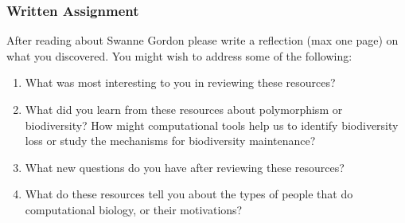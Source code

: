 \documentclass{article}
\begin{document}
\subsubsection*{Written Assignment} 
After reading about Swanne Gordon please write a reflection (max one page) on what you discovered. You might wish to address some of the following: 

\begin{enumerate}
\item What was most interesting to you in reviewing these resources?
\item What did you learn from these resources about polymorphism or biodiversity? How might computational tools help us to identify biodiversity loss or study the mechanisms for biodiversity maintenance?
\item What new questions do you have after reviewing these resources?
\item What do these resources tell you about the types of people that do computational biology, or their motivations?
\end{enumerate}

\EndAccSupp{}
\end{document}

